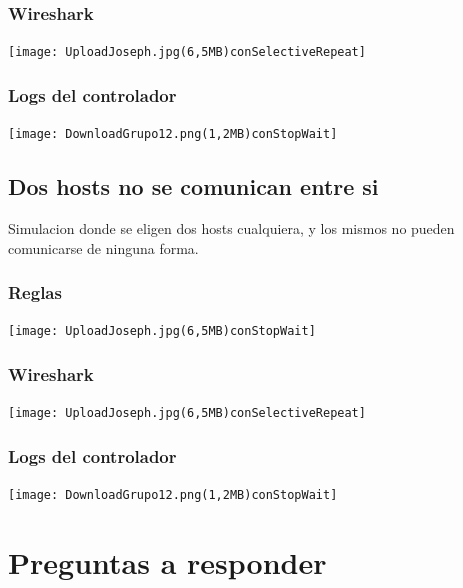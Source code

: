 \documentclass{article}
\begin{document}
\subsubsection{Wireshark}
\begin{center}
\texttt{[image: UploadJoseph.jpg(6,5MB)conSelectiveRepeat]}
\end{center}

\subsubsection{Logs del controlador}
\begin{center}
\texttt{[image: DownloadGrupo12.png(1,2MB)conStopWait]}
\end{center}

\subsection{Dos hosts no se comunican entre si}
Simulacion donde se eligen dos hosts cualquiera, y los mismos no pueden comunicarse de ninguna forma.

\subsubsection{Reglas}
\begin{center}
\texttt{[image: UploadJoseph.jpg(6,5MB)conStopWait]}
\end{center}

\subsubsection{Wireshark}
\begin{center}
\texttt{[image: UploadJoseph.jpg(6,5MB)conSelectiveRepeat]}
\end{center}

\subsubsection{Logs del controlador}
\begin{center}
\texttt{[image: DownloadGrupo12.png(1,2MB)conStopWait]}
\end{center}


\section{\texorpdfstring{\textbf{Preguntas a responder}}{Preguntas a responder}}\label{preguntas-a-responder}
\end{document}
